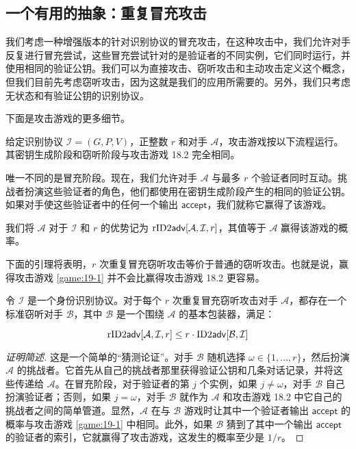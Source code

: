 \subsection{一个有用的抽象：重复冒充攻击}

我们考虑一种增强版本的针对识别协议的冒充攻击，在这种攻击中，我们允许对手反复进行冒充尝试，这些冒充尝试针对的是验证者的不同实例，它们同时运行，并使用相同的验证公钥。我们可以为直接攻击、窃听攻击和主动攻击定义这个概念，但我们目前先考虑窃听攻击，因为这就是我们的应用所需要的。另外，我们只考虑无状态和有验证公钥的识别协议。

下面是攻击游戏的更多细节。

\begin{game}[$r$ 次重复冒充窃听攻击]\label{game:19-1}
给定识别协议 $\mathcal{I}=(G,P,V)$，正整数 $r$ 和对手 $\mathcal{A}$，攻击游戏按以下流程运行。其密钥生成阶段和窃听阶段与攻击游戏 18.2 完全相同。

唯一不同的是冒充阶段。现在，我们允许对手 $\mathcal{A}$ 与最多 $r$ 个验证者同时互动。挑战者扮演这些验证者的角色，他们都使用在密钥生成阶段产生的相同的验证公钥。如果对手使这些验证者中的任何一个输出 $\mathsf{accept}$，我们就称它赢得了该游戏。

我们将 $\mathcal{A}$ 对于 $\mathcal{I}$ 和 $r$ 的优势记为 ${\rm rID2\mathsf{adv}}[\mathcal{A},\mathcal{I},r]$，其值等于 $\mathcal{A}$ 赢得该游戏的概率。
\end{game}

下面的引理将表明，$r$ 次重复冒充窃听攻击等价于普通的窃听攻击。也就是说，赢得攻击游戏 \ref{game:19-1} 并不会比赢得攻击游戏 18.2 更容易。

\begin{lemma}\label{theo:19-6}
令 $\mathcal{I}$ 是一个身份识别协议。对于每个 $r$ 次重复冒充窃听攻击对手 $\mathcal{A}$，都存在一个标准窃听对手 $\mathcal{B}$，其中 $\mathcal{B}$ 是一个围绕 $\mathcal{A}$ 的基本包装器，满足：

\begin{equation}
{\rm rID2\mathsf{adv}}[\mathcal{A},\mathcal{I},r]\leq r\cdot{\rm ID2\mathsf{adv}}[\mathcal{B}, \mathcal{I}]
\end{equation}

\end{lemma}

\begin{proof}[证明简述]
这是一个简单的“猜测论证”。对手 $\mathcal{B}$ 随机选择 $\omega\in\{1,\dots,r\}$，然后扮演 $\mathcal{A}$ 的挑战者。它首先从自己的挑战者那里获得验证公钥和几条对话记录，并将这些传递给 $\mathcal{A}$。在冒充阶段，对于验证者的第 $j$ 个实例，如果 $j\neq\omega$，对手 $\mathcal{B}$ 自己扮演验证者；否则，如果 $j=\omega$，对手 $\mathcal{B}$ 就作为 $\mathcal{A}$ 和攻击游戏 18.2 中它自己的挑战者之间的简单管道。显然，$\mathcal{A}$ 在与 $\mathcal{B}$ 游戏时让其中一个验证者输出 $\mathsf{accept}$ 的概率与攻击游戏 \ref{game:19-1} 中相同。此外，如果 $\mathcal{B}$ 猜到了其中一个输出 $\mathsf{accept}$ 的验证者的索引，它就赢得了攻击游戏，这发生的概率至少是 ${1}/{r}$。
\end{proof}

